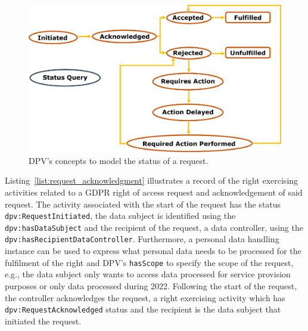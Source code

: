 \begin{figure}[htp]
    \centering
    \includegraphics[width=0.8\linewidth]{figures/chapter-4/request-status.png}
    \caption{DPV's concepts to model the status of a request.}
    \label{fig:request_status}
\end{figure}

Listing~\ref{list:request_acknowledgment} illustrates a record of the right exercising activities related to a GDPR right of access request and acknowledgement of said request.
The activity associated with the start of the request has the status \texttt{dpv:RequestInitiated}, the data subject is identified using the \texttt{dpv:hasDataSubject} and the recipient of the request, a data controller, using the \texttt{dpv:hasRecipientDataController}.
Furthermore, a personal data handling instance can be used to express what personal data needs to be processed for the fulfilment of the right and DPV's \texttt{hasScope} to specify the scope of the request, e.g., the data subject only wants to access data processed for service provision purposes or only data processed during 2022.
Following the start of the request, the controller acknowledges the request, a right exercising activity which has \texttt{dpv:RequestAcknowledged} status and the recipient is the data subject that initiated the request.

